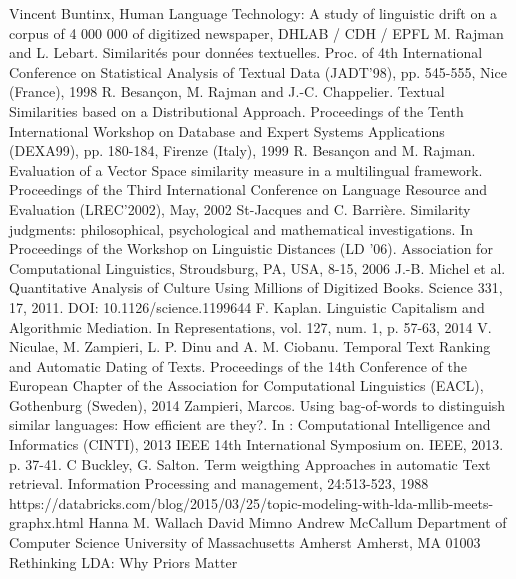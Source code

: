 \clearpage
\begin{thebibliography}{20}
\bibitem{} Vincent Buntinx, Human Language Technology: A study of linguistic drift on a corpus of 4 000 000 of digitized newspaper, DHLAB / CDH / EPFL
\bibitem{} M. Rajman and L. Lebart. Similarités pour données textuelles. Proc. of 4th International Conference on Statistical Analysis of Textual Data (JADT'98), pp. 545-555, Nice (France), 1998
\bibitem{} R. Besançon, M. Rajman and J.-C. Chappelier. Textual Similarities based on a Distributional Approach. Proceedings of the Tenth International Workshop on Database and Expert Systems Applications (DEXA99), pp. 180-184, Firenze (Italy), 1999
\bibitem{} R. Besançon and M. Rajman. Evaluation of a Vector Space similarity measure in a multilingual framework. Proceedings of the Third International Conference on Language Resource and Evaluation (LREC'2002), May, 2002
\bibitem{} St-Jacques and C. Barrière. Similarity judgments: philosophical, psychological and mathematical investigations. In Proceedings of the Workshop on Linguistic Distances (LD '06). Association for Computational Linguistics, Stroudsburg, PA, USA, 8-15, 2006
\bibitem{} J.-B. Michel et al. Quantitative Analysis of Culture Using Millions of Digitized Books. Science 331, 17, 2011. DOI: 10.1126/science.1199644
\bibitem{} F. Kaplan. Linguistic Capitalism and Algorithmic Mediation. In Representations, vol. 127, num. 1, p. 57-63, 2014
\bibitem{} V. Niculae, M. Zampieri, L. P. Dinu and A. M. Ciobanu. Temporal Text Ranking and Automatic Dating of Texts. Proceedings of the 14th Conference of the European Chapter of the Association for Computational Linguistics (EACL), Gothenburg (Sweden), 2014
\bibitem{} Zampieri, Marcos. Using bag-of-words to distinguish similar languages: How efficient are they?. In : Computational Intelligence and Informatics (CINTI), 2013 IEEE 14th International Symposium on. IEEE, 2013. p. 37-41.
\bibitem{} C Buckley, G. Salton. Term weigthing Approaches in automatic Text retrieval. Information Processing and management, 24:513-523, 1988
\bibitem{} https://databricks.com/blog/2015/03/25/topic-modeling-with-lda-mllib-meets-graphx.html
\bibitem{} Hanna M. Wallach David Mimno Andrew McCallum Department of Computer Science University of Massachusetts Amherst Amherst, MA 01003 Rethinking LDA: Why Priors Matter
\end{thebibliography} 
